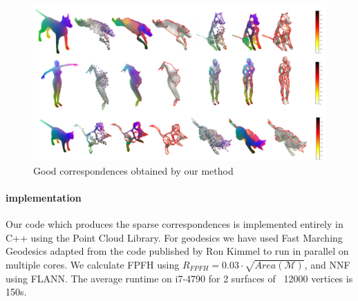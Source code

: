 \documentclass[10pt,twocolumn,letterpaper]{article}
\begin{document}
\begin{figure}[htb]
	\centering

	\includegraphics[width=1\textwidth]{figures/success_1}
	\caption{Good correspondences obtained by our method}
\end{figure}



\paragraph{implementation}
Our code which produces the sparse correspondences is implemented entirely in C++ using the Point Cloud Library. For geodesics we have used  Fast Marching Geodesics adapted from the code published by Ron Kimmel to run in parallel on multiple cores. We calculate FPFH using $R_{FPFH}=0.03\cdot \sqrt{Area(\mathcal{M})}$, and NNF using FLANN. The average runtime on i7-4790 for 2 surfaces of ~12000 vertices is 150s.

{\small
	
	
}
\end{document}
